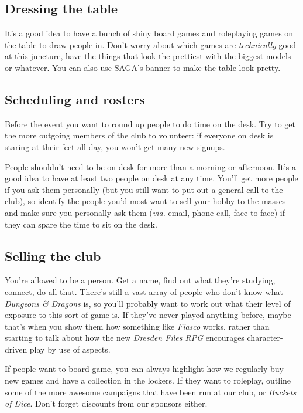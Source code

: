 \subsection{Dressing the table}

It's a good idea to have a bunch of shiny board games and roleplaying games on the table to draw people in. Don't worry about which games are \textit{technically} good at this juncture, have the things that look the prettiest with the biggest models or whatever. You can also use SAGA's banner to make the table look pretty.

\subsection{Scheduling and rosters}

Before the event you want to round up people to do time on the desk. Try to get the more outgoing members of the club to volunteer: if everyone on desk is staring at their feet all day, you won't get many new signups.

People shouldn't need to be on desk for more than a morning or afternoon. It's a good idea to have at least two people on desk at any time. You'll get more people if you ask them personally (but you still want to put out a general call to the club), so identify the people you'd most want to sell your hobby to the masses and make sure you personally ask them (\textit{via.} email, phone call, face-to-face) if they can spare the time to sit on the desk.

\subsection{Selling the club}

You're allowed to be a person. Get a name, find out what they're studying, connect, do all that.  There's still a vast array of people who don't know what \textit{Dungeons \& Dragons} is, so you'll probably want to work out what their level of exposure to this sort of game is. If they've never played anything before, maybe that's when you show them how something like \textit{Fiasco} works, rather than starting to talk about how the new \textit{Dresden Files RPG} encourages character-driven play by use of aspects.

If people want to board game, you can always highlight how we regularly buy new games and have a collection in the lockers. If they want to roleplay, outline some of the more awesome campaigns that have been run at our club, or \textit{Buckets of Dice}. Don't forget discounts from our sponsors either.

